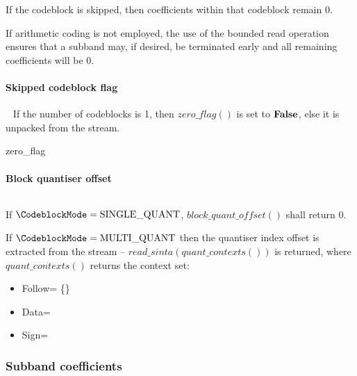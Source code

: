If the codeblock is skipped, then coefficients within that codeblock remain 0.

\begin{informative}
If arithmetic coding is not employed, the use of the bounded read operation ensures
that a subband may, if desired, be terminated early and all remaining coefficients
will be 0.
\end{informative}

\paragraph{Skipped codeblock flag}
\label{zeroblockflag}
$\ $\newline$\ $\newline
If the number of codeblocks is 1, then $zero\_flag()$ is set to $\text{\bf{False}}$, else
it is unpacked from the stream.

\begin{pseudo}{zero\_flag}{}
    \bsRET{\false}
\bsELSE
\bsEND
\end{pseudo}

\paragraph{Block quantiser offset}
$\ $\newline$\ $\newline
\label{blockquantidx}

If $\CodeblockMode=\SingleQuantiser$,  $block\_quant\_offset()$ shall return 0.

If $\CodeblockMode=\MultipleQuantiser$ then the quantiser index offset
is extracted from the stream -- $read\_sinta(quant\_contexts())$ is returned, where
$quant\_contexts()$ returns the context set:

\begin{itemize}
\item{Follow= \{\QOffsetFollow\}}
\item{Data=\QOffsetData}
\item{Sign=\QOffsetSign}
\end{itemize}

\subsubsection{Subband coefficients}

